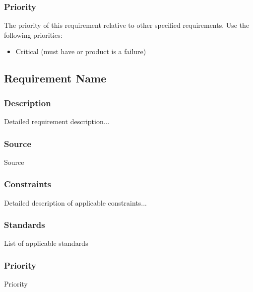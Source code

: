 \subsubsection{Priority}
The priority of this requirement relative to other specified requirements. Use the following priorities:
\begin{itemize}
\item Critical (must have or product is a failure)
\end{itemize}

\subsection{Requirement Name}
\subsubsection{Description}
Detailed requirement description...
\subsubsection{Source}
Source
\subsubsection{Constraints}
Detailed description of applicable constraints...
\subsubsection{Standards}
List of applicable standards
\subsubsection{Priority}
Priority
